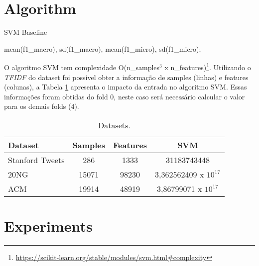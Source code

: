 \documentclass{article}
\begin{document}
	\section{Algorithm}
	
	\begin{algorithm}[ht]	
		\caption{SVM Baseline}
		\label{alg:Baseline}
		
		\Return mean(f1\_macro), sd(f1\_macro), mean(f1\_micro), sd(f1\_micro);
	\end{algorithm}

	O algoritmo SVM tem complexidade O(n\_samples$^3$ x n\_features)\footnote{\url{https://scikit-learn.org/stable/modules/svm.html\#complexity}}. Utilizando o \textit{TFIDF} do dataset foi possível obter a informação de samples (linhas) e features (colunas), a Tabela \ref{tab:dataset} apresenta o impacto da entrada no algoritmo SVM. Essas informações foram obtidas do fold 0, neste caso será necessário calcular o valor para os demais folds (4).
	
	\begin{table}[ht]
		\small
		\centering	
		\begin{tabular}{l c c c}	
			\toprule
			\textbf{Dataset} & \textbf{Samples} & \textbf{Features} & \textbf{SVM} \\
			\midrule    				
			Stanford Tweets & 286 & 1333 & 31183743448 \\ 
			20NG & 15071 & 98230 & 3,362562409 x $10^{17}$\\
			ACM & 19914 & 48919 & 3,86799071 x $10^{17}$\\
			\bottomrule 
		\end{tabular}
		\caption{Datasets.}
		\label{tab:dataset}
	\end{table}	
	
	
	
	\section{Experiments}
	
\end{document}

